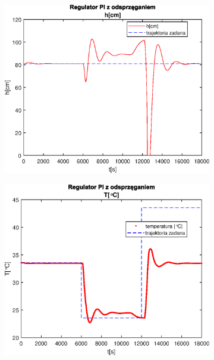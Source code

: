 \begin{figure}[h!]
   \centering
   \begin{subfigure}[b]{0.4\textwidth}
      \includegraphics[width=1\linewidth]{img/PI/decoupler/noDisturbance/PIDecouplerH3Lintrue.eps}
      \caption{}
      \label{fig:fig:PIDecoupler3Lintrue1}
   \end{subfigure}
       
   \begin{subfigure}[b]{0.4\textwidth}
      \includegraphics[width=1\linewidth]{img/PI/decoupler/noDisturbance/PIDecouplerT3Lintrue.eps}
      \caption{}
      \label{fig:fig:PIDecoupler3Lintrue2}
   \end{subfigure}
       

\end{figure}
